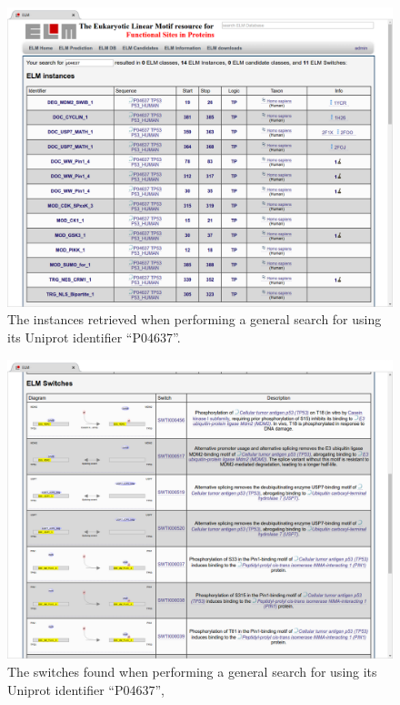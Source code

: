 \begin{enumerate}

\begin{figure}[h!]
	\centering
	\includegraphics[width=\textwidth]{Figures/general_search/P04637_instances.png} 
	\caption{
		The instances retrieved when performing a general search for
		 using its Uniprot identifier ``P04637''.
	}
	\label{fig:general_search_P04637_instances}
\end{figure}

\begin{figure}[h!]
	\centering
	\includegraphics[width=\textwidth]{Figures/general_search/P04637_switches.png} 
	\caption{
		The switches found when performing a general search for
		 using its Uniprot identifier ``P04637'',
	}
	\label{fig:general_search_P04637_switches}
\end{figure}



\end{enumerate}
